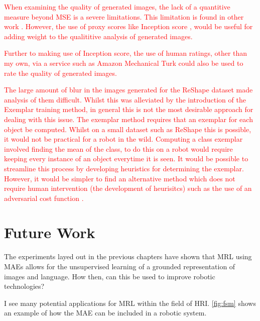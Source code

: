 \textcolor{red}{When examining the quality of generated images, the lack of a quantitive measure beyond \ac{MSE} is a severe limitations. This limitation is found in other work \cite{reed2016generative, zhang2017stackgan, xu2018attngan, li2018video, mansimov2015generating}. However, the use of proxy scores like Inception score \cite{zhang2017stackgan}, would be useful for adding weight to the qualititive analysis of generated images.}

\textcolor{red}{Further to making use of Inception score, the use of human ratings, other than my own, via a service such as Amazon Mechanical Turk could also be used to rate the quality of generated images.}

\textcolor{red}{The large amount of blur in the images generated for the ReShape dataset made analysis of them difficult. Whilst this was alleviated by the introduction of the Exemplar training method, in general this is not the most desirable approach for dealing with this issue. The exemplar method requires that an exemplar for each object be computed. Whilst on a small dataset such as ReShape this is possible, it would not be practical for a robot in the wild. Computing a class exemplar involved finding the mean of the class, to do this on a robot would require keeping every instance of an object everytime it is seen. It would be possible to streamline this process by developing heuristics for determining the exemplar. However, it would be simpler to find an alternative method which does not require human intervention (the development of heurisitcs) such as the use of an adversarial cost function \cite{reed2016generative}.}

\section{Future Work}
The experiments layed out in the previous chapters have shown that \ac{MRL} using \acp{MAE} allows for the unsupervised learning of a grounded representation of images and language. How then, can this be used to improve robotic technologies?

I see many potential applications for \ac{MRL} within the field of \ac{HRI}. \autoref{fig:fsm} shows an example of how the \ac{MAE} can be included in a robotic system.


